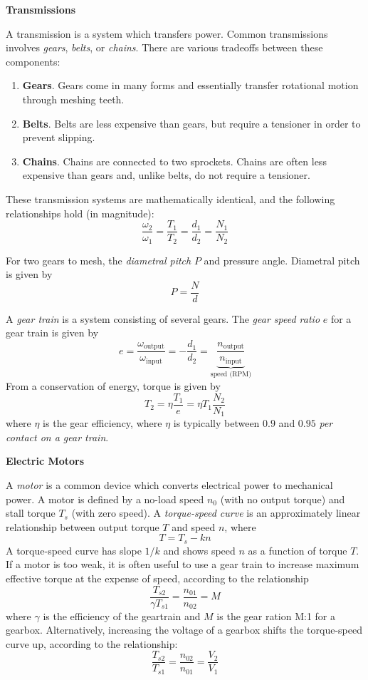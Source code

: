 \textbf{Transmissions}

A transmission is a system which transfers power. Common transmissions involves \textit{gears}, \textit{belts}, or \textit{chains}. There are various tradeoffs between these components:
\begin{enumerate}
    \item[] \textbf{Gears}. Gears come in many forms and essentially transfer rotational motion through meshing teeth.
    \item[] \textbf{Belts}. Belts are less expensive than gears, but require a tensioner in order to prevent slipping.
    \item[] \textbf{Chains}. Chains are connected to two sprockets. Chains are often less expensive than gears and, unlike belts, do not require a tensioner.
\end{enumerate} These transmission systems are mathematically identical, and the following relationships hold (in magnitude): \[\frac{\omega_2}{\omega_1} = \frac{T_1}{T_2} = \frac{d_1}{d_2} = \frac{N_1}{N_2}\]

For two gears to mesh, the \textit{diametral pitch} $P$ and pressure angle. Diametral pitch is given by \[P = \frac{N}{d}\]

A \textit{gear train} is a system consisting of several gears. The \textit{gear speed ratio} $e$ for a gear train is given by \[e = \frac{\omega_\text{output}}{\omega_\text{input}} = -\frac{d_1}{d_2} = \underbrace{\frac{n_\text{output}}{n_\text{input}}}_\text{speed (RPM)}\] From a conservation of energy, torque is given by \[T_2 = \eta\frac{T_1}{e} = \eta T_1 \frac{N_2}{N_1}\] where $\eta$ is the gear efficiency, where $\eta$ is typically between $0.9$ and $0.95$ \textit{per contact on a gear train}. 

\textbf{Electric Motors}

A \textit{motor} is a common device which converts electrical power to mechanical power. A motor is defined by a no-load speed $n_0$ (with no output torque) and stall torque $T_s$ (with zero speed). A \textit{torque-speed curve} is an approximately linear relationship between output torque $T$ and speed $n$, where \[T = T_s - kn\] A torque-speed curve has slope $1/k$ and shows speed $n$ as a function of torque $T$. If a motor is too weak, it is often useful to use a gear train to increase maximum effective torque at the expense of speed, according to the relationship \[\frac{T_{s2}}{\gamma T_{s1}} = \frac{n_{01}}{n_{02}} = M\] where $\gamma$ is the efficiency of the geartrain and $M$ is the gear ration M:1 for a gearbox. Alternatively, increasing the voltage of a gearbox shifts the torque-speed curve up, according to the relationship: \[\frac{T_{s2}}{T_{s1}} = \frac{n_{02}}{n_{01}} = \frac{V_2}{V_1}\]


